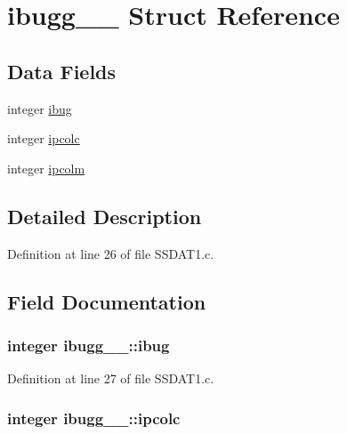 \hypertarget{structibugg__1__}{}\section{ibugg\+\_\+\_\+ Struct Reference}
\label{structibugg__1__}
\subsection*{Data Fields}
\begin{DoxyCompactItemize}
\item 
integer \hyperlink{structibugg__1___a68b9ebb8c9b4b90bd51165d6330367bf}{ibug}
\item 
integer \hyperlink{structibugg__1___afc5c98f2f67c21bcdf978817204a9d87}{ipcolc}
\item 
integer \hyperlink{structibugg__1___a1f6512285f507b49fb0e8360911da705}{ipcolm}
\end{DoxyCompactItemize}


\subsection{Detailed Description}


Definition at line 26 of file S\+S\+D\+A\+T1.\+c.



\subsection{Field Documentation}
\subsubsection[{\texorpdfstring{ibug}{ibug}}]{\setlength{\rightskip}{0pt plus 5cm}integer ibugg\+\_\+\_\+\+::ibug}\hypertarget{structibugg__1___a68b9ebb8c9b4b90bd51165d6330367bf}{}\label{structibugg__1___a68b9ebb8c9b4b90bd51165d6330367bf}


Definition at line 27 of file S\+S\+D\+A\+T1.\+c.

\subsubsection[{\texorpdfstring{ipcolc}{ipcolc}}]{\setlength{\rightskip}{0pt plus 5cm}integer ibugg\+\_\+\_\+\+::ipcolc}\hypertarget{structibugg__1___afc5c98f2f67c21bcdf978817204a9d87}{}\label{structibugg__1___afc5c98f2f67c21bcdf978817204a9d87}


